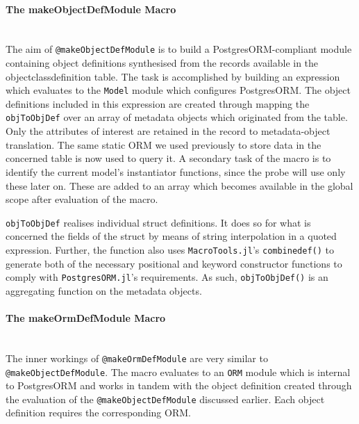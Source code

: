 \documentclass{juliacon}
\begin{document}
\paragraph{The makeObjectDefModule Macro}\hfill\\

The aim of \texttt{@makeObjectDefModule} is to build a PostgresORM-compliant module containing object definitions synthesised from the records available in the objectclassdefinition table. The task is accomplished by building an expression which evaluates to the \texttt{Model} module which configures PostgresORM. The object definitions included in this expression are created through mapping the \texttt{objToObjDef} over an array of metadata objects which originated from the table. Only the attributes of interest are retained in the record to metadata-object translation. The same static ORM we used previously to store data in the concerned table is now used to query it. A secondary task of the macro is to identify the current model's instantiator functions, since the probe will use only these later on. These are added to an array which becomes available in the global scope after evaluation of the macro. \vskip 6pt

\texttt{objToObjDef} realises individual struct definitions. It does so for what is concerned the fields of the struct by means of string interpolation in a quoted expression. Further, the function also uses \mbox{\texttt{MacroTools.jl}'s} \texttt{combinedef()} to generate both of the necessary positional and keyword constructor functions to comply with \mbox{\texttt{PostgresORM.jl}'s} requirements. As such, \texttt{objToObjDef()} is an aggregating function on the metadata objects.

\paragraph{The makeOrmDefModule Macro}\hfill\\

The inner workings of \texttt{@makeOrmDefModule} are very similar to \texttt{@makeObjectDefModule}. The macro evaluates to an \texttt{ORM} module which is internal to PostgresORM and works in tandem with the object definition created through the evaluation of the \texttt{@makeObjectDefModule} discussed earlier. Each object definition requires the corresponding ORM.\vskip 6pt
\end{document}
